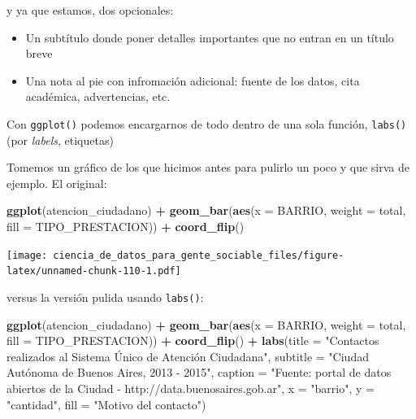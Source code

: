 \documentclass[spanish,]{book}
\newenvironment{Shaded}{\begin{snugshade}}{\end{snugshade}}
\newcommand{\DataTypeTok}[1]{\textcolor[rgb]{0.13,0.29,0.53}{#1}}
\newcommand{\KeywordTok}[1]{\textcolor[rgb]{0.13,0.29,0.53}{\textbf{#1}}}
\newcommand{\NormalTok}[1]{#1}
\newcommand{\OperatorTok}[1]{\textcolor[rgb]{0.81,0.36,0.00}{\textbf{#1}}}
\newcommand{\StringTok}[1]{\textcolor[rgb]{0.31,0.60,0.02}{#1}}
\providecommand{\tightlist}{%
  \setlength{\itemsep}{0pt}\setlength{\parskip}{0pt}}
\begin{document}
y ya que estamos, dos opcionales:

\begin{itemize}
\tightlist
\item
  Un subtítulo donde poner detalles importantes que no entran en un título breve
\item
  Una nota al pie con infromación adicional: fuente de los datos, cita académica, advertencias, etc.
\end{itemize}

Con \texttt{ggplot()} podemos encargarnos de todo dentro de una sola función, \texttt{labs()} (por \emph{labels}, etiquetas)

Tomemos un gráfico de los que hicimos antes para pulirlo un poco y que sirva de ejemplo. El original:

\begin{Shaded}
\begin{Highlighting}[]
\KeywordTok{ggplot}\NormalTok{(atencion_ciudadano) }\OperatorTok{+}
\StringTok{    }\KeywordTok{geom_bar}\NormalTok{(}\KeywordTok{aes}\NormalTok{(}\DataTypeTok{x =}\NormalTok{ BARRIO, }\DataTypeTok{weight =}\NormalTok{ total, }\DataTypeTok{fill =}\NormalTok{ TIPO_PRESTACION)) }\OperatorTok{+}
\StringTok{    }\KeywordTok{coord_flip}\NormalTok{()}
\end{Highlighting}
\end{Shaded}

\texttt{[image: ciencia\_de\_datos\_para\_gente\_sociable\_files/figure-latex/unnamed-chunk-110-1.pdf]}

versus la versión pulida usando \texttt{labs()}:

\begin{Shaded}
\begin{Highlighting}[]
\KeywordTok{ggplot}\NormalTok{(atencion_ciudadano) }\OperatorTok{+}
\StringTok{    }\KeywordTok{geom_bar}\NormalTok{(}\KeywordTok{aes}\NormalTok{(}\DataTypeTok{x =}\NormalTok{ BARRIO, }\DataTypeTok{weight =}\NormalTok{ total, }\DataTypeTok{fill =}\NormalTok{ TIPO_PRESTACION)) }\OperatorTok{+}
\StringTok{    }\KeywordTok{coord_flip}\NormalTok{() }\OperatorTok{+}
\StringTok{    }\KeywordTok{labs}\NormalTok{(}\DataTypeTok{title =} \StringTok{"Contactos realizados al Sistema Único de Atención Ciudadana"}\NormalTok{,}
         \DataTypeTok{subtitle =} \StringTok{"Ciudad Autónoma de Buenos Aires, 2013 - 2015"}\NormalTok{,}
         \DataTypeTok{caption =} \StringTok{"Fuente: portal de datos abiertos de la Ciudad - http://data.buenosaires.gob.ar"}\NormalTok{,}
         \DataTypeTok{x =} \StringTok{"barrio"}\NormalTok{,}
         \DataTypeTok{y =} \StringTok{"cantidad"}\NormalTok{,}
         \DataTypeTok{fill =} \StringTok{"Motivo del contacto"}\NormalTok{)}
\end{Highlighting}
\end{Shaded}
\end{document}
